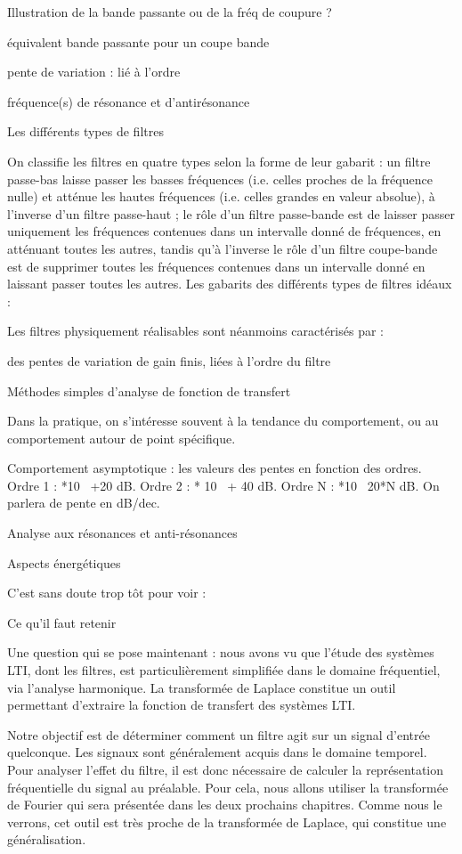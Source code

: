 \documentclass[]{article}
\begin{document}
Illustration de la bande passante ou de la fréq de coupure ?

équivalent bande passante pour un coupe bande

pente de variation : lié à l'ordre

fréquence(s) de résonance et d'antirésonance

Les différents types de filtres

On classifie les filtres en quatre types selon la forme de leur gabarit
: un filtre passe-bas laisse passer les basses fréquences (i.e. celles
proches de la fréquence nulle) et atténue les hautes fréquences (i.e.
celles grandes en valeur absolue), à l'inverse d'un filtre passe-haut ;
le rôle d'un filtre passe-bande est de laisser passer uniquement les
fréquences contenues dans un intervalle donné de fréquences, en
atténuant toutes les autres, tandis qu'à l'inverse le rôle d'un filtre
coupe-bande est de supprimer toutes les fréquences contenues dans un
intervalle donné en laissant passer toutes les autres. Les gabarits des
différents types de filtres idéaux :

Les filtres physiquement réalisables sont néanmoins caractérisés par :

des pentes de variation de gain finis, liées à l'ordre du filtre

Méthodes simples d'analyse de fonction de transfert

Dans la pratique, on s'intéresse souvent à la tendance du comportement,
ou au comportement autour de point spécifique.

Comportement asymptotique : les valeurs des pentes en fonction des
ordres. Ordre 1 : *10~ +20 dB. Ordre 2 : * 10~ + 40 dB. Ordre N : *10~
20*N dB. On parlera de pente en dB/dec.

Analyse aux résonances et anti-résonances

Aspects énergétiques

C'est sans doute trop tôt pour voir :~

Ce qu'il faut retenir

Une question qui se pose maintenant : nous avons vu que l'étude des
systèmes LTI, dont les filtres, est particulièrement simplifiée dans le
domaine fréquentiel, via l'analyse harmonique. La transformée de Laplace
constitue un outil permettant d'extraire la fonction de transfert des
systèmes LTI.

Notre objectif est de déterminer comment un filtre agit sur un signal
d'entrée quelconque. Les signaux sont généralement acquis dans le
domaine temporel. Pour analyser l'effet du filtre, il est donc
nécessaire de calculer la représentation fréquentielle du signal au
préalable. Pour cela, nous allons utiliser la transformée de Fourier qui
sera présentée dans les deux prochains chapitres. Comme nous le verrons,
cet outil est très proche de la transformée de Laplace, qui constitue
une généralisation.~
\end{document}
